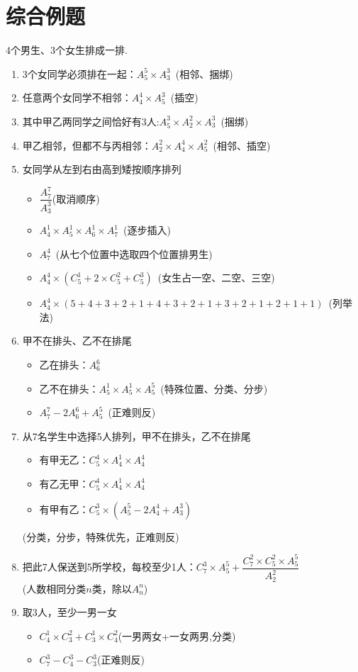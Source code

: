 \documentclass{BHCexam}
\begin{document}
\section{综合例题}
\begin{example}
4个男生、3个女生排成一排.
\begin{enumerate}[1)]
\item 3个女同学必须排在一起：$A_5^5\times A_3^3$~{(\kaishu 相邻、捆绑)}
\item 任意两个女同学不相邻：$A_4^4\times A_5^3$~{(\kaishu 插空)}
\item 其中甲乙两同学之间恰好有$3$人:$A_5^3\times A_2^2\times A^3_3$~{\kaishu (捆绑)}
\item 甲乙相邻，但都不与丙相邻：$A_2^2\times A_4^4\times A_5^2$~{\kaishu (相邻、插空)}
\item 女同学从左到右由高到矮按顺序排列
\begin{itemize}
\item $\dfrac{A^7_7}{A^3_3}${\kaishu(取消顺序)}
\item $A^1_4\times A_5^1\times A_6^1\times A_7^1$~{\kaishu(逐步插入)}
\item $A_7^4$~{\kaishu(从七个位置中选取四个位置排男生)}
\item $ A_4^4\times(C_5^1+2\times C_5^2+C_5^3) $~{\kaishu (女生占一空、二空、三空)}
\item $A_4^4\times (5+4+3+2+1+4+3+2+1+3+2+1+2+1+1)$~{\kaishu(列举法)}
\end{itemize}
\item 甲不在排头、乙不在排尾
\begin{itemize}
\item 乙在排头：$A_6^6$
\item 乙不在排头：$A_5^1\times A_5^1\times A_5^5$~{\kaishu(特殊位置、分类、分步)}
\item $A_7^7-2A_6^6+A_5^5$~{\kaishu(正难则反)} 
\end{itemize}
\item 从7名学生中选择5人排列，甲不在排头，乙不在排尾
\begin{itemize}
\item 有甲无乙：$C_5^4\times A_4^1\times A^4_4$
\item 有乙无甲：$C_5^4\times A_4^1 \times A_4^4$
\item 有甲有乙：$C_5^3\times (A_5^5-2A_4^4+A_3^3)$
\end{itemize}
{\kaishu (分类，分步，特殊优先，正难则反)}
\item 把此7人保送到5所学校，每校至少1人：$ C_7^3\times A^5_5+\dfrac{C_7^2\times C_5^2\times A_5^5}{A_2^2} $~\\{\kaishu(人数相同分类$ n $类，除以$ A_n^n $)}
\item 取3人，至少一男一女
\begin{itemize}
\item $C_4^1\times C_3^2+C_3^1\times C_4^2${\kaishu(一男两女+一女两男,分类)}
\item $C_7^3-C_4^3-C_3^3${\kaishu(正难则反)}
\end{itemize}
\end{enumerate}
\end{example}

\end{document}
